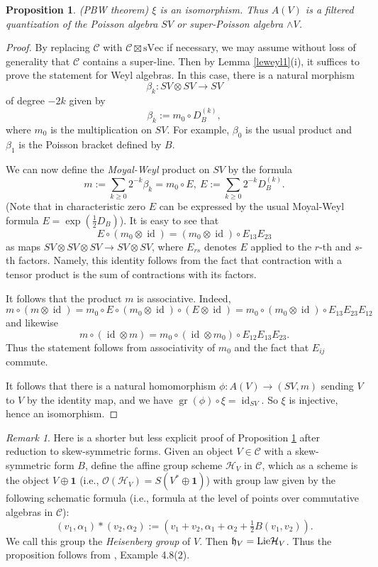 \documentclass[12pt]{amsart}
\numberwithin{equation}{section}
\providecommand{\C}{}\renewcommand{\C}{\mathcal{C}}
\providecommand{\sVec}{}\renewcommand{\sVec}{\mathrm{sVec}}
\providecommand{\h}{}\renewcommand{\h}{\mathfrak{h}}
\providecommand{\id}{}\renewcommand{\id}{\operatorname{id}}
\theoremstyle{plain}
\newtheorem{proposition}[theorem]{Proposition}
\theoremstyle{definition}
\theoremstyle{remark}
\newtheorem{remark}[theorem]{Remark}
\begin{document}
\begin{proposition}\label{pbw} (PBW theorem) $\xi$ is an isomorphism. Thus $A(V)$ is a filtered quantization of the  Poisson 
algebra $SV$ or super-Poisson algebra $\wedge V$. 
\end{proposition} 

\begin{proof} By replacing $\C$ with $\C\boxtimes \sVec$ if necessary, we may assume without loss of generality that $\C$ contains a super-line. Then by Lemma \ref{leweyl1}(i), it suffices to prove the statement for Weyl algebras.
In this case, there is a natural morphism
$$
\beta_k: SV\otimes SV\to SV
$$ 
of degree $-2k$ given by 
$$
\beta_k:=m_0\circ D_B^{(k)},
$$
where $m_0$ is the multiplication on $SV$. For example, $\beta_0$ is the usual product and $\beta_1$ is the Poisson bracket defined by $B$. 

We can now define the {\it Moyal-Weyl} product on $SV$ by the formula 
$$
m:=\sum_{k\ge 0}2^{-k}\beta_k=m_0\circ E,\ E:=\sum_{k\ge 0}2^{-k}D_B^{(k)}.
$$
(Note that in characteristic zero $E$ can be expressed by the usual Moyal-Weyl formula
$E=\exp(\tfrac{1}{2}D_B)$).
It is easy to see that 
$$
E\circ (m_0\otimes \id)=(m_0\otimes \id) \circ E_{13}E_{23}
$$
as maps $SV\otimes SV\otimes SV\to SV\otimes SV$, where $E_{rs}$ denotes $E$ applied to the $r$-th and $s$-th factors. Namely, this identity follows from the fact that contraction with a tensor product is the sum of contractions with its factors. 

It follows that the product $m$ is associative. Indeed, 
$$
m\circ (m\otimes \id)=m_0\circ E\circ (m_0\otimes \id)\circ (E\otimes \id)=
m_0\circ (m_0\otimes \id) \circ E_{13}E_{23}E_{12}
$$
and likewise 
$$
m\circ (\id\otimes m)=m_0\circ (\id \otimes m_0) \circ E_{12}E_{13}E_{23}.
$$
Thus the statement follows from associativity of $m_0$ and the fact that $E_{ij}$ commute.

It follows that there is a natural homomorphism $\phi: A(V)\to (SV,m)$ sending $V$ to $V$ by the identity map, and we have $\operatorname{gr}(\phi)\circ \xi=\id_{SV}$. So $\xi$ is injective, hence an isomorphism. 
\end{proof} 

\begin{remark} Here is a shorter but less explicit proof of Proposition \ref{pbw} after reduction to skew-symmetric forms. Given an object $V\in \C$ with a skew-symmetric form $B$, define the affine group scheme $\mathcal H_V$ in $\C$, which 
as a scheme is the object $V\oplus {\mathbf 1}$ (i.e., $\mathcal O(\mathcal H_V)=S(V^*\oplus {\mathbf 1})$) with group law given by the following schematic formula (i.e., formula at the level of points over commutative algebras in $\C$): 
$$
(v_1,\alpha_1)*(v_2,\alpha_2):=(v_1+v_2,\alpha_1+\alpha_2+\tfrac{1}{2}B(v_1,v_2)).
$$
We call this group the {\it Heisenberg group} of $V$. Then $\h_V={\rm Lie}\mathcal H_V$. Thus 
the proposition follows from
\cite{E}, Example 4.8(2). 
\end{remark} 
\end{document}
